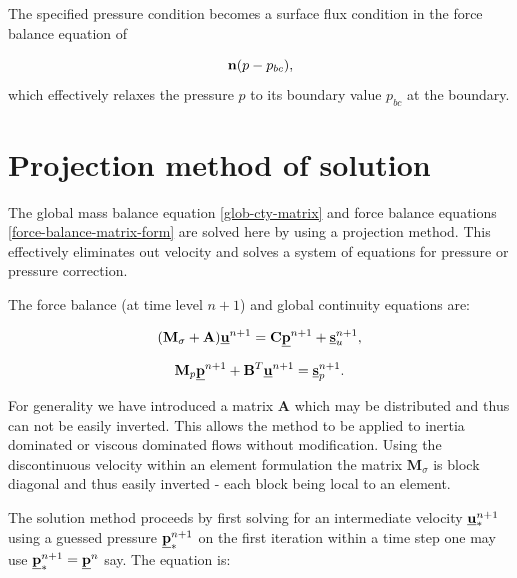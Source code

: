 The specified pressure condition becomes a surface flux
condition in the force balance equation of

\begin{equation}
{\bf n} (p-p_{bc}),
\end{equation}
which effectively relaxes the pressure $p$ to its boundary
value $p_{bc}$ at the boundary.



\pagebreak


\section{Projection method of solution}
\label{Projection method of solution}

The
global mass balance equation \ref{glob-cty-matrix} and
force balance equations \ref{force-balance-matrix-form} are solved here
by using a projection method. This effectively eliminates
out velocity and solves a system of equations for
pressure or pressure correction.

The force balance (at time level $n+1$)
and global continuity equations are:

\begin{equation}
({\mathbf M}_\sigma +{\mathbf A}) \underline{\bf u}^{n+1} = {\mathbf C} \underline{\bf p}^{n+1} + \underline{\bf s}_u^{n+1},
\label{force-balance-matrix-form2}
\end{equation}

\begin{equation}
{\mathbf M}_p \underline{\bf p}^{n+1} + {\mathbf B}^T \underline{\bf u}^{n+1} = \underline{\bf s}_p^{n+1}.
\label{glob-cty-matrix2}
\end{equation}

For generality we have introduced a matrix ${\mathbf A}$ which may be
distributed and thus can not be easily inverted.
This allows the method to be applied to inertia dominated
or viscous dominated flows without modification.
Using the discontinuous velocity within an element
formulation the matrix ${\mathbf M}_\sigma$ is block diagonal
and thus easily inverted - each block being local to an element.

The solution method proceeds by first solving for
an intermediate velocity $\underline{\bf u}^{n+1}_*$ using a
guessed pressure $\underline{\bf p}^{n+1}_*$ on the first iteration
within a time step one may use $\underline{\bf p}^{n+1}_*=\underline{\bf p}^n$ say.
The equation is:

